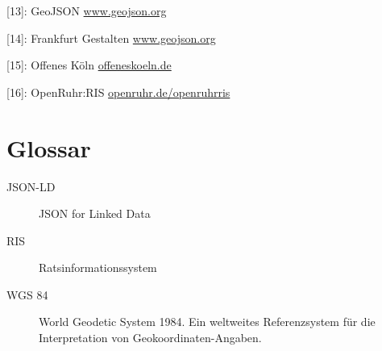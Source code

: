 \documentclass[,a4paper]{article}
\begin{document}
{[}13{]}: GeoJSON \href{http://www.geojson.org/}{www.geojson.org}

{[}14{]}: Frankfurt Gestalten
\href{http://www.geojson.org/}{www.geojson.org}

{[}15{]}: Offenes Köln \href{http://offeneskoeln.de/}{offeneskoeln.de}

{[}16{]}: OpenRuhr:RIS
\href{http://openruhr.de/openruhrris/}{openruhr.de/openruhrris}

\section{Glossar}

\begin{description}
\item[JSON-LD]
JSON for Linked Data
\item[RIS]
Ratsinformationssystem
\item[WGS 84]
World Geodetic System 1984. Ein weltweites Referenzsystem für die
Interpretation von Geokoordinaten-Angaben.
\end{description}
\end{document}
